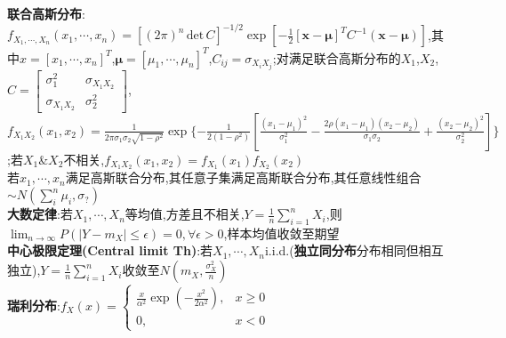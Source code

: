 \documentclass[UTF8,a4paper,10pt]{article}
\providecommand{\abs}[1]{\left\lvert#1\right\rvert}
\providecommand{\det}{\,\text{det}\,}
\begin{document}
\begin{multicols}{2}
    \textbf{联合高斯分布}:$f_{X_1,\cdots,X_n}(x_1,\cdots,x_n)=[(2\pi)^n\det C]^{-1/2}\exp[-\frac{1}{2}[\bm{x}-\bm{\mu}]^TC^{-1}(\bm{x}-\bm{\mu})]$,其中$x=[x_1,\cdots,x_n]^T$,$\bm{\mu}=[\mu_1,\cdots,\mu_n]^T$,$C_{ij}=\sigma_{X_iX_j}$;对满足联合高斯分布的$X_1$,$X_2$,$C=\left[\begin{smallmatrix}
        \sigma_1^2&\sigma_{X_1X_2}\\
        \sigma_{X_1X_2}&\sigma_2^2
    \end{smallmatrix}\right]$,$f_{X_1X_2}(x_1,x_2)=\frac{1}{2\pi\sigma_1\sigma_2\sqrt{1-\rho^2}}\exp\{-\frac{1}{2(1-\rho^2)}[\frac{(x_1-\mu_1)^2}{\sigma_1^2}-\frac{2\rho(x_1-\mu_1)(x_2-\mu_2)}{\sigma_1\sigma_2}+\frac{(x_2-\mu_2)^2}{\sigma_2^2}]\}$;若$X_1$\&$X_2$不相关,$f_{X_1X_2}(x_1,x_2)=f_{X_1}(x_1)f_{X_2}(x_2)$\\
    若$x_1,\cdots,x_n$满足高斯联合分布,其任意子集满足高斯联合分布,其任意线性组合$\sim N(\sum_i^n\mu_i,\sigma_?)$\\
    \textbf{大数定律}:若$X_1,\cdots,X_n$等均值,方差且不相关,$Y=\frac{1}{n}\sum_{i=1}^nX_i$,则$\lim_{n\rightarrow\infty}P(\abs{Y-m_X}\leq\epsilon)=0,\forall\epsilon>0$,样本均值收敛至期望\\
    \textbf{中心极限定理(Central limit Th)}:若$X_1,\cdots,X_n$i.i.d.(\textbf{独立同分布}分布相同但相互独立),$Y=\frac{1}{n}\sum_{i=1}^nX_i$收敛至$N(m_X,\frac{\sigma_X^2}{n})$\\
    \textbf{瑞利分布}:$f_X(x)=\left\{\begin{array}{ll}
        \frac{x}{\alpha^2}\exp(-\frac{x^2}{2\alpha^2}),&x\geq 0\\
        0,&x<0
    \end{array}\right.$
\end{multicols}
\end{document}
